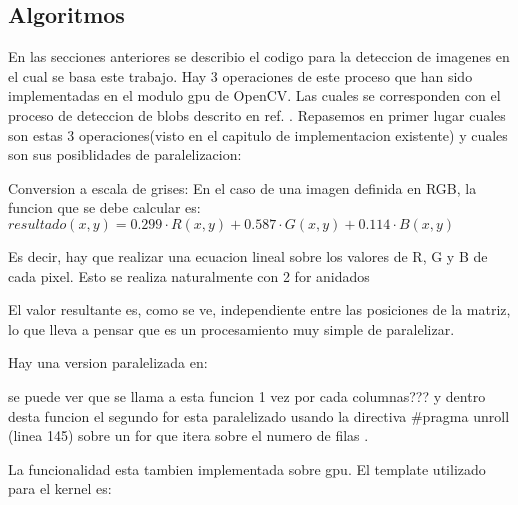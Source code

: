 \documentclass[a4paper,10pt]{report}
\begin{document}
\subsection{Algoritmos}

En las secciones anteriores se describio el codigo para la deteccion de imagenes en el cual se basa este trabajo. 
Hay 3 operaciones de este proceso que han sido implementadas en el modulo gpu de OpenCV. Las cuales se corresponden con el proceso de deteccion de blobs descrito en ref. \cite[capitulo 5.1]{Jaureguiberry}.
Repasemos en primer lugar cuales son estas 3 operaciones(visto en el capitulo de implementacion existente) y cuales son sus posiblidades de paralelizacion:

Conversion a escala de grises: En el caso de una imagen definida en RGB, la funcion que se debe calcular es: \\
 $resultado(x,y)= 0.299  \cdot R(x,y) + 0.587  \cdot G(x,y) + 0.114  \cdot B(x,y)$  
 
 Es decir, hay que realizar una ecuacion lineal sobre los valores de R, G y B de cada pixel. 
 Esto se realiza naturalmente con 2 for anidados
 
  El valor resultante es, como se ve, independiente entre las posiciones de la matriz, lo que lleva a pensar que es un procesamiento muy simple de paralelizar.
 
 Hay una version paralelizada en:
 

 se puede ver que se llama a esta funcion 1 vez por cada columnas??? y dentro desta funcion el segundo for esta paralelizado usando la directiva \#pragma unroll (linea 145) sobre un for que itera sobre el numero de filas .
  
La funcionalidad esta tambien implementada sobre gpu. 
El template utilizado para el kernel es:

\end{document}
